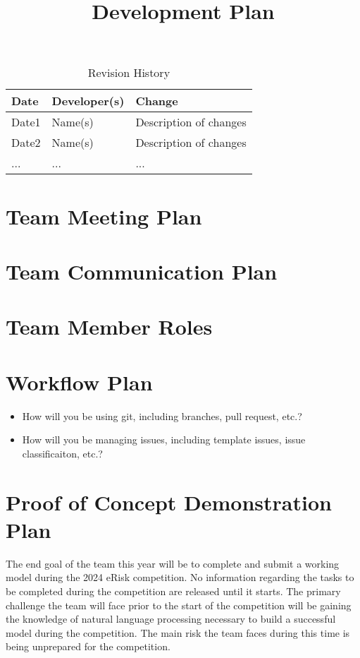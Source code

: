 \documentclass{article}
\title{Development Plan\\\progname}
\author{\authname}
\date{}
\begin{document}
\maketitle

\begin{table}[hp]
\caption{Revision History} \label{TblRevisionHistory}
\begin{tabularx}{\textwidth}{llX}
\toprule
\textbf{Date} & \textbf{Developer(s)} & \textbf{Change}\\
\midrule
Date1 & Name(s) & Description of changes\\
Date2 & Name(s) & Description of changes\\
... & ... & ...\\
\bottomrule
\end{tabularx}
\end{table}


\section{Team Meeting Plan}

\section{Team Communication Plan}

\section{Team Member Roles}

\section{Workflow Plan}

\begin{itemize}
	\item How will you be using git, including branches, pull request, etc.?
	\item How will you be managing issues, including template issues, issue
	classificaiton, etc.?
\end{itemize}

\section{Proof of Concept Demonstration Plan}

The end goal of the team this year will be to complete and submit a working model during the 2024 eRisk competition. No information regarding the tasks to be completed during the competition are released until it starts. The primary challenge the team will face prior to the start of the competition will be gaining the knowledge of natural language processing necessary to build a successful model during the competition. The main risk the team faces during this time is being unprepared for the competition.
\end{document}
